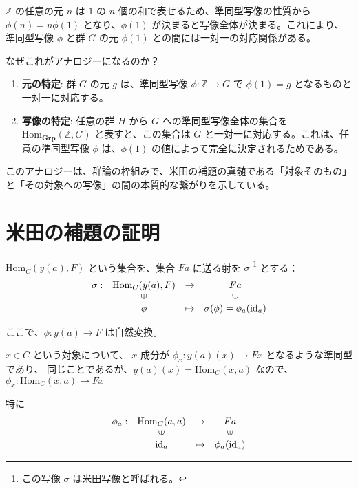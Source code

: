 \documentclass[uplatex,a4j,12pt,dvipdfmx]{jsarticle}
\begin{document}
$\mathbb{Z}$ の任意の元 $n$ は $1$ の $n$ 個の和で表せるため、準同型写像の性質から $\phi(n) = n\phi(1)$ となり、$\phi(1)$ が決まると写像全体が決まる。これにより、準同型写像 $\phi$ と群 $G$ の元 $\phi(1)$ との間には一対一の対応関係がある。

なぜこれがアナロジーになるのか？

\begin{enumerate}
	\item \textbf{元の特定}: 群 $G$ の元 $g$ は、準同型写像 $\phi: \mathbb{Z} \to G$ で $\phi(1) = g$ となるものと一対一に対応する。
	\item \textbf{写像の特定}: 任意の群 $H$ から $G$ への準同型写像全体の集合を $\text{Hom}_{\mathbf{Grp}}(\mathbb{Z}, G)$ と表すと、この集合は $G$ と一対一に対応する。これは、任意の準同型写像 $\phi$ は、$\phi(1)$ の値によって完全に決定されるためである。
\end{enumerate}

このアナロジーは、群論の枠組みで、米田の補題の真髄である「対象そのもの」と「その対象への写像」の間の本質的な繋がりを示している。









\section{米田の補題の証明}

$\text{Hom}_{C}(y(a),F)$ という集合を、集合 $Fa$ に送る射を $\sigma$ \footnote{この写像 $\sigma$ は米田写像と呼ばれる。} とする：
\[
	\begin{array}{cccc}
		\sigma : & \text{Hom}_{C}(y(a),F)  & \to     & Fa                                     \\
		         & \rotatebox{90}{${\in}$} &         & \rotatebox{90}{${\in}$}                \\
		         & \phi                    & \mapsto & \sigma(\phi) = \phi_{a}(\text{id}_{a})
	\end{array}
\]

ここで、$\phi: y(a) \to F$ は自然変換。

$x \in C$ という対象について、 $x$ 成分が $\phi_{x} : y(a)(x) \to Fx$ となるような準同型であり、
同じことであるが、$y(a)(x)=\text{Hom}_{C}(x,a)$ なので、 $\phi_{x} : \text{Hom}_{C}(x,a) \to Fx$

特に
\[
	\begin{array}{cccc}
		\phi_{a} : & \text{Hom}_{C}(a,a)     & \to     & Fa                      \\
		           & \rotatebox{90}{${\in}$} &         & \rotatebox{90}{${\in}$} \\
		           & \text{id}_{a}           & \mapsto & \phi_{a}(\text{id}_{a})
	\end{array}
\]
\end{document}
